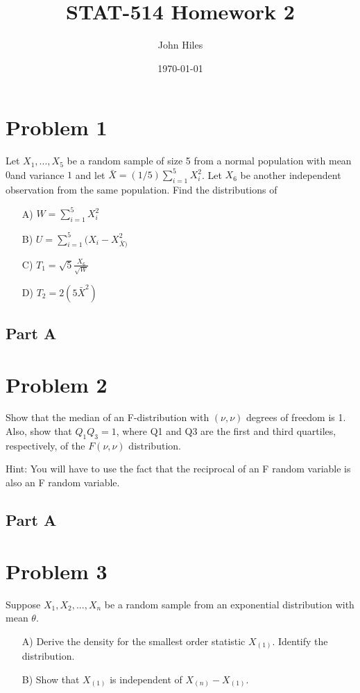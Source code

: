 \documentclass{article}
\title{STAT-514 Homework 2}
\author{John Hiles}
\date\today
\begin{document}
\maketitle %

\section*{Problem 1}
Let $X_1,...,X_5$ be a random sample of size 5 from a normal population with mean $0 $and variance $1$ and let $\bar{X}=(1/5)\sum_{i=1}^{5}X_i^2$. Let $X_6$ be another independent observation from the same population. Find the distributions of
\begin{enumerate}
\item[A)] $W=\sum_{i=1}^5 X_i^2$
\item[B)] $U=\sum_{i=1}^5 (X_i-X_{\bar{X})}^2$
\item[C)] $T_1 = \sqrt{5} \frac{X_6}{\sqrt{W}}$
\item[D)] $T_2 = 2(5\bar{X}^2)$

\end{enumerate}
\subsection*{Part A}

\clearpage

\section*{Problem 2}
 Show that the median of an F-distribution with $(\nu, \nu)$ degrees of freedom is 1. Also,
show that $Q_1Q_3 = 1$, where Q1 and Q3 are the first and third quartiles, respectively, of the $F(\nu,\nu)$
distribution.

Hint: You will have to use the fact that the reciprocal of an F random variable is also an F random
variable.

\subsection*{Part A}

    
\clearpage
\section*{Problem 3}
Suppose $X_1,X_2,...,X_n$ be a random sample from an exponential distribution with mean $\theta$.
\begin{enumerate}
\item[A)] Derive the density for the smallest order statistic $X_{(1)}$. Identify the distribution.
\item[B)] Show that $X_{(1)}$ is independent of $X_{(n)}-X_{(1)}$.
\end{enumerate}
\end{document}
